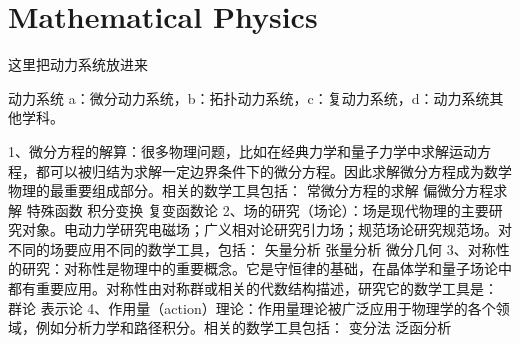 

\chapter{Mathematical Physics}

这里把动力系统放进来

动力系统
a：微分动力系统，b：拓扑动力系统，c：复动力系统，d：动力系统其他学科。



1、微分方程的解算：很多物理问题，比如在经典力学和量子力学中求解运动方程，都可以被归结为求解一定边界条件下的微分方程。因此求解微分方程成为数学物理的最重要组成部分。相关的数学工具包括：
常微分方程的求解
偏微分方程求解
特殊函数
积分变换
复变函数论
2、场的研究（场论）：场是现代物理的主要研究对象。电动力学研究电磁场；广义相对论研究引力场；规范场论研究规范场。对不同的场要应用不同的数学工具，包括：
矢量分析
张量分析
微分几何
3、对称性的研究：对称性是物理中的重要概念。它是守恒律的基础，在晶体学和量子场论中都有重要应用。对称性由对称群或相关的代数结构描述，研究它的数学工具是：
群论
表示论
4、作用量（action）理论：作用量理论被广泛应用于物理学的各个领域，例如分析力学和路径积分。相关的数学工具包括：
变分法
泛函分析
